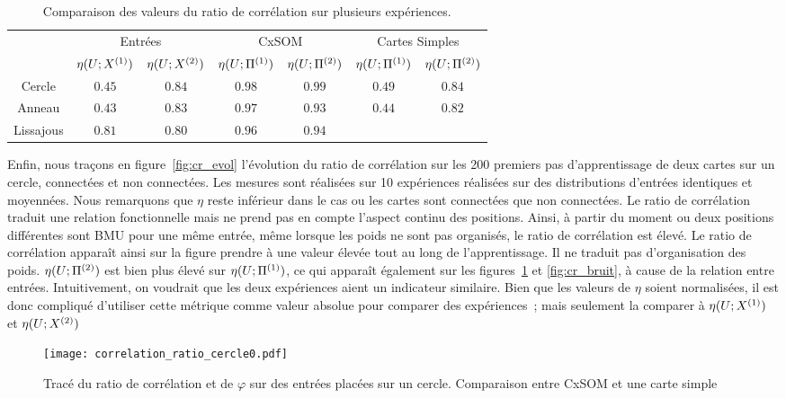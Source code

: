 \documentclass[../main]{subfiles}
\begin{document}
\begin{table}
    \centering
    \caption{Comparaison des valeurs du ratio de corrélation sur plusieurs expériences.}
    \begin{tabular}{*7c}
        \toprule
        & \multicolumn{2}{c}{Entrées} & \multicolumn{2}{c}{CxSOM} & \multicolumn{2}{c}{Cartes Simples} \\
        \cmidrule(lr){2-7}
         & $\eta(U;X^{({1})})$ & $\eta(U;X^{({2})})$  & $\eta(U;\Pi^{({1})})$ & $\eta(U;\Pi^{({2})})$  & $\eta(U;\Pi^{({1})})$ & $\eta(U;\Pi^{({2})})$ \\    
        \midrule
        Cercle &   $0.45 $    & $0.84$  &  $0.98$ & $0.99$ & $0.49$ & $0.84$      \\
        Anneau &  $0.43$      &  $0.83$      & $0.97$ & $0.93$ & $0.44$ & $0.82$ \\
        Lissajous &  $0.81$     &  $0.80$ & $0.96$ & $0.94$  & & \\
        \bottomrule
    \end{tabular}
\end{table}
Enfin, nous traçons en figure~\ref{fig:cr_evol} l'évolution du ratio de corrélation sur les 200 premiers pas d'apprentissage de deux cartes sur un cercle, connectées et non connectées. Les mesures sont réalisées sur 10 expériences réalisées sur des distributions d'entrées identiques et moyennées.
Nous remarquons que $\eta$ reste inférieur dans le cas ou les cartes sont connectées que non connectées. 
Le ratio de corrélation traduit une relation fonctionnelle mais ne prend pas en compte l'aspect continu des positions. Ainsi, à partir du moment ou deux positions différentes sont BMU pour une même entrée, même lorsque les poids ne sont pas organisés, le ratio de corrélation est élevé. Le ratio de corrélation apparaît ainsi sur la figure prendre à une valeur élevée tout au long de l'apprentissage. Il ne traduit pas d'organisation des poids.
$\eta(U;\Pi^{({2})})$ est bien plus élevé sur $\eta(U;\Pi^{({1})})$, ce qui apparaît également sur les figures~\ref{fig:cr_xp} et \ref{fig:cr_bruit}, à cause de la relation entre entrées.
Intuitivement, on voudrait que les deux expériences aient un indicateur similaire.
Bien que les valeurs de $\eta$ soient normalisées, il est donc compliqué d'utiliser cette métrique comme valeur absolue pour comparer des expériences~; mais seulement la comparer à $\eta(U;X^{({1})})$ et $\eta(U;X^{({2})})$

\begin{figure}
    \centering\texttt{[image: correlation\_ratio\_cercle0.pdf]}
    \caption{Tracé du ratio de corrélation et de $\varphi$ sur des entrées placées sur un cercle. Comparaison entre CxSOM et une carte simple \label{fig:cr_xp}}
\end{figure}
\end{document}
